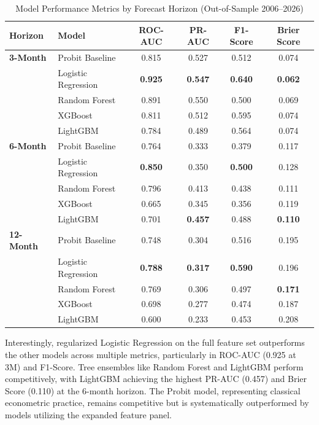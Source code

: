 \documentclass[11pt]{article}
\begin{document}
\begin{table}[H]
\centering
\caption{Model Performance Metrics by Forecast Horizon (Out-of-Sample 2006--2026)}
\label{tab:performance}
\begin{tabular}{llcccc}
\toprule
\textbf{Horizon} & \textbf{Model} & \textbf{ROC-AUC} & \textbf{PR-AUC} & \textbf{F1-Score} & \textbf{Brier Score} \\
\midrule
\textbf{3-Month} & Probit Baseline & 0.815 & 0.527 & 0.512 & 0.074 \\
 & Logistic Regression & \textbf{0.925} & \textbf{0.547} & \textbf{0.640} & \textbf{0.062} \\
 & Random Forest & 0.891 & 0.550 & 0.500 & 0.069 \\
 & XGBoost & 0.811 & 0.512 & 0.595 & 0.074 \\
 & LightGBM & 0.784 & 0.489 & 0.564 & 0.074 \\
\midrule
\textbf{6-Month} & Probit Baseline & 0.764 & 0.333 & 0.379 & 0.117 \\
 & Logistic Regression & \textbf{0.850} & 0.350 & \textbf{0.500} & 0.128 \\
 & Random Forest & 0.796 & 0.413 & 0.438 & 0.111 \\
 & XGBoost & 0.665 & 0.345 & 0.356 & 0.119 \\
 & LightGBM & 0.701 & \textbf{0.457} & 0.488 & \textbf{0.110} \\
\midrule
\textbf{12-Month} & Probit Baseline & 0.748 & 0.304 & 0.516 & 0.195 \\
 & Logistic Regression & \textbf{0.788} & \textbf{0.317} & \textbf{0.590} & 0.196 \\
 & Random Forest & 0.769 & 0.306 & 0.497 & \textbf{0.171} \\
 & XGBoost & 0.698 & 0.277 & 0.474 & 0.187 \\
 & LightGBM & 0.600 & 0.233 & 0.453 & 0.208 \\
\bottomrule
\end{tabular}
\end{table}

Interestingly, regularized Logistic Regression on the full feature set outperforms the other models across multiple metrics, particularly in ROC-AUC (0.925 at 3M) and F1-Score. Tree ensembles like Random Forest and LightGBM perform competitively, with LightGBM achieving the highest PR-AUC (0.457) and Brier Score (0.110) at the 6-month horizon. The Probit model, representing classical econometric practice, remains competitive but is systematically outperformed by models utilizing the expanded feature panel.
\end{document}
